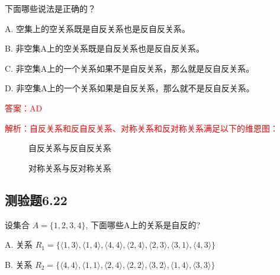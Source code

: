 \documentclass[UTF8, heading=true]{ctexart}
\begin{document}
下面哪些说法是正确的？

A. 空集上的空关系既是自反关系也是反自反关系。

B. 非空集A上的空关系既是自反关系也是反自反关系。

C. 非空集A上的一个关系如果不是自反关系，那么就是反自反关系。

D. 非空集A上的一个关系如果是自反关系，那么就不是反自反关系。

\textcolor{red}{答案：AD}

\textcolor{red}{解析：自反关系和反自反关系、对称关系和反对称关系满足以下的维恩图：}

\begin{figure}[H]
  \centering
  \begin{minipage}{0.45\textwidth}
      \centering
      \caption{自反关系与反自反关系}
  \end{minipage}
  \hspace{0.1cm}
  \begin{minipage}{0.45\textwidth}
      \centering
      \caption{对称关系与反对称关系}
  \end{minipage}
\end{figure}

\subsection{测验题6.22}

设集合 $A=\{1,2,3,4\}$, 下面哪些A上的关系是自反的?

A. 关系 $R_1=\{\langle 1,3\rangle,\langle 1,4\rangle,\langle 4,4\rangle,\langle 2,4\rangle,\langle 2,3\rangle,\langle 3,1\rangle,\langle 4,3\rangle\}$

B. 关系 $R_2=\{\langle 4,4\rangle,\langle 1,1\rangle,\langle 2,4\rangle,\langle 2,2\rangle,\langle 3,2\rangle,\langle 1,4\rangle,\langle 3,3\rangle\}$
\end{document}
